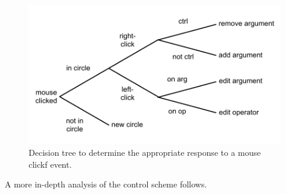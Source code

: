 \documentclass[12pt,twoside,notitlepage,xetex]{report}
\begin{document}
\begin{center}
\begin{figure}[H]
\begin{center}
\includegraphics[width=\textwidth-4cm]{figs/nico_click.pdf}
\end{center}
\caption{Decision tree to determine the appropriate response to a mouse clickf event.}
\label{fig:ClickTree}
\end{figure}
\end{center}

A more in-depth analysis of the control scheme follows.
\end{document}
